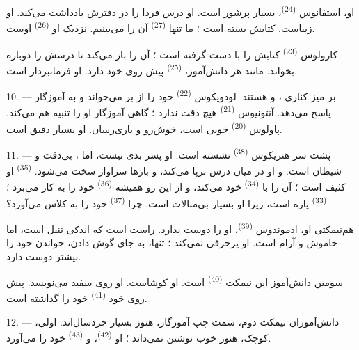  او، استفانوس \textsuperscript{(24)}، بسیار پرشور است.
او درس فردا را در دفترش یادداشت می‌کند.  او زیباست.
کتابش بسته است ؛ ما تنها  \textsuperscript{(27)} آن را
می‌بینیم. نزدیک او  \textsuperscript{(26)} اوست.

کارولوس \textsuperscript{(23)} کتابش را با دست گرفته است ؛ آن را باز
می‌کند تا درسش را دوباره بخواند. مانند هر دانش‌آموز، 
\textsuperscript{(25)} پیش روی خود دارد. او فرمانبردار است.

10. --- بر میز کناری ،  و
 هستند. لودویکوس  \textsuperscript{(22)} خود
را از بر می‌خواند و به  آموزگار پاسخ می‌دهد. آنتونیوس
\textsuperscript{(21)} هیچ دقت ندارد ؛ گاهی آموزگار او را تنبیه هم
می‌کند. پاولوس \textsuperscript{(20)}  خوبی است، خوش‌رو و
یاری‌رسان. او بسیار دقیق است.

\VUsaut{4.2mm}
\VUsaut{3.2mm}

11. --- پشت سر هنریکوس  \textsuperscript{(38)} نشسته
است. او پسر بدی نیست، اما ، بی‌دقت و شیطان است.
 و  او در میان درس  برپا
می‌کند، و بارها سزاوار  سخت می‌شود.  \textsuperscript{(35)} او کثیف است ؛ آن را با 
\textsuperscript{(34)} خود  می‌کند، و از این رو همیشه
 \textsuperscript{(36)} خود را به کار می‌برد ؛
 \textsuperscript{(33)} پاره است، زیرا او بسیار
بی‌مبالات است. چرا  \textsuperscript{(37)} خود را به
کلاس  می‌آورد؟

هم‌نیمکتی او، ادموندوس \textsuperscript{(39)}، او را دوست ندارد. راست
است که اندکی تنبل است، اما خاموش و آرام است. او پرحرفی نمی‌کند ؛ تنها،
به جای گوش دادن، خواندن   خود
را بیشتر دوست دارد.

سومین دانش‌آموز این نیمکت  \textsuperscript{(40)}
است. او کوشاست. او روی  سفید می‌نویسد. پیش روی خود
 \textsuperscript{(41)} خود را گذاشته است.

12. --- دانش‌آموزان نیمکت دوم، سمت چپ آموزگار، هنوز بسیار خردسال‌اند.
اولی،  کوچک، هنوز خوب نوشتن نمی‌داند ؛ او  \textsuperscript{(42)}،  و 
\textsuperscript{(43)} خود را می‌آورد.

